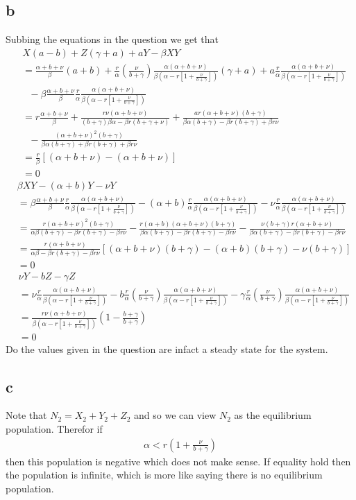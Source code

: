 \documentclass{unswmaths}
\newcommand{\N}{\frac{\alpha(\alpha + b + \nu)}{\beta \left(\alpha - r\left[ 1 + \frac{\nu}{b + \gamma}\right] \right)}}
\newcommand{\X}{\frac{\alpha + b + \nu}{\beta}}
\newcommand{\Y}{\frac{r}{\alpha}\N}
\newcommand{\Z}{\frac{r}{\alpha}\left( \frac{\nu}{b + \gamma} \right)\N}
\begin{document}
\subsection*{b}
    Subbing the equations in the question we get that
    \begin{align*}
        & X(a-b) + Z(\gamma + a) + aY - \beta XY\\ 
&= \X(a+b) + \Z(\gamma + a) + a\Y \\
& \ \ \ - \beta\X\Y \\
&= r\X + \frac{r\nu(\alpha + b + \nu)}{(b+\gamma)\beta\alpha - \beta r(b +\gamma + \nu)} +
\frac{ar(\alpha + b + \nu)(b + \gamma)}{\beta\alpha (b + \gamma) - \beta r ( b + \gamma) + \beta r \nu} \\
& \ \ \ - \frac{(\alpha + b + \nu)^2(b+\gamma)}{\beta\alpha(b + \gamma) + \beta r(b + \gamma) + \beta r \nu} \\
&= \frac{r}{\beta}\left[(\alpha + b + \nu)- (\alpha + b + \nu)\right] \\
&= 0
\end{align*}
\begin{align*}
    &\beta X Y - (\alpha + b) Y - \nu Y \\
    &= \beta \X\Y - (\alpha + b)\Y - \nu \Y \\
    &= \frac{r(\alpha + b + \nu)^2(b + \gamma)}{\alpha\beta(b + \gamma) - \beta r (b + \gamma) - \beta r \nu} 
- \frac{r(\alpha + b)(\alpha + b + \nu)(b + \gamma)}{\beta \alpha(b + \gamma)- \beta r (b + \gamma) - \beta r \nu } 
- \frac{\nu(b + \gamma) r(\alpha + b + \nu)}{\beta \alpha(b + \gamma) -  \beta r (b + \gamma) - \beta r \nu } \\
    &= \frac{r(\alpha+b + \nu)}{\alpha \beta - \beta r (b + \gamma) - \beta r \nu} \left[ (\alpha + b + \nu)(b + \gamma) - (\alpha + b)(b+\gamma) - \nu(b + \gamma)\right] \\
    &= 0
\end{align*}
\begin{align*}
    & \nu Y - b Z - \gamma Z \\
    &= \nu \Y - b \Z - \gamma \Z \\
    &= \frac{r\nu(\alpha + b + \nu)}{\beta\left(\alpha - r\left[ 1 + \frac{\nu}{b + \gamma} \right] \right)} \left( 1 - \frac{b + \gamma}{b + \gamma}\right) \\
    &= 0
\end{align*}
Do the values given in the question are infact a steady state for the system.
\subsection*{c}
Note that $ N_2 = X_2 + Y_2 + Z_2 $ and so we can view $ N_2 $ as the equilibrium population. Therefor if
\begin{align*}
    \alpha < r\left( 1 + \frac{\nu}{b + \gamma}\right)
\end{align*}
then this population is negative which does not make sense. If equality hold then the population is infinite, which is more like saying there is no equilibrium population.
\end{document}
